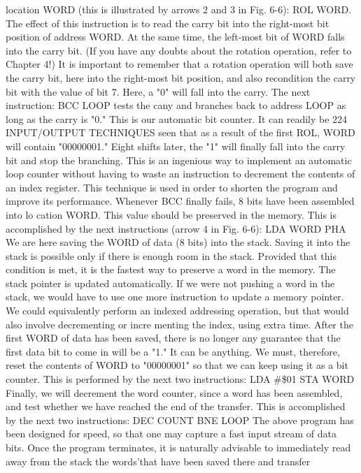 \documentclass{book}
\begin{document}
location WORD (this is illustrated by arrows 2 and 3 in Fig. 6-6):
ROL WORD.
The effect of this instruction is to read the carry bit into the
right-most bit position of address WORD. At the same time, the
left-most bit of WORD falls into the carry bit. (If you have any
doubts about the rotation operation, refer to Chapter 4!)
It is important to remember that a rotation operation will both
save the carry bit, here into the right-most bit position, and also
recondition the carry bit with the value of bit 7.
Here, a "0" will fall into the carry. The next instruction:
BCC LOOP
tests the cany and branches back to address LOOP as long as the
carry is "0." This is our automatic bit counter. It can readily be
224
INPUT/OUTPUT TECHNIQUES
seen that as a result of the first ROL, WORD will contain
"00000001." Eight shifts later, the "1" will finally fall into the
carry bit and stop the branching. This is an ingenious way to
implement an automatic loop counter without having to waste an
instruction to decrement the contents of an index register. This
technique is used in order to shorten the program and improve its
performance.
Whenever BCC finally fails, 8 bits have been assembled into lo
cation WORD. This value should be preserved in the memory. This
is accomplished by the next instructions (arrow 4 in Fig. 6-6):
LDA WORD
PHA
We are here saving the WORD of data (8 bits) into the stack.
Saving it into the stack is possible only if there is enough room in
the stack. Provided that this condition is met, it is the fastest way
to preserve a word in the memory. The stack pointer is updated
automatically. If we were not pushing a word in the stack, we
would have to use one more instruction to update a memory
pointer. We could equivalently perform an indexed addressing
operation, but that would also involve decrementing or incre
menting the index, using extra time.
After the first WORD of data has been saved, there is no longer
any guarantee that the first data bit to come in will be a "1." It can
be anything. We must, therefore, reset the contents of WORD to
"00000001" so that we can keep using it as a bit counter. This is
performed by the next two instructions:
LDA #\$01
STA WORD
Finally, we will decrement the word counter, since a word has
been assembled, and test whether we have reached the end of the
transfer. This is accomplished by the next two instructions:
DEC COUNT
BNE LOOP
The above program has been designed for speed, so that one
may capture a fast input stream of data bits. Once the program
terminates, it is naturally advisable to immediately read away
from the stack the words'that have been saved there and transfer
\end{document}
